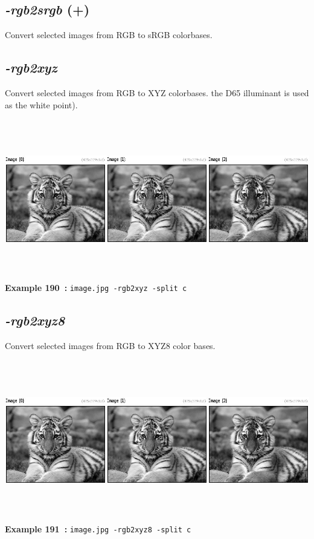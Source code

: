 \documentclass[a4paper,11pt,twoside]{book}
\begin{document}
\subsection{\emph{-rgb2srgb} (+)}\vspace*{-0.5em}
Convert selected images from RGB to sRGB colorbases.


\subsection{\emph{-rgb2xyz} }\vspace*{-0.5em}
Convert selected images from RGB to XYZ colorbases.
the D65 illuminant is used as the white point).
\begin{center}\includegraphics[keepaspectratio=true,height=7cm,width=\textwidth]{img/gmic_def190.jpg}\\
{\footnotesize \textbf{Example 190~:} \texttt{image.jpg -rgb2xyz -split c}}
\end{center}

\subsection{\emph{-rgb2xyz8} }\vspace*{-0.5em}
Convert selected images from RGB to XYZ8 color bases.
\begin{center}\includegraphics[keepaspectratio=true,height=7cm,width=\textwidth]{img/gmic_def191.jpg}\\
{\footnotesize \textbf{Example 191~:} \texttt{image.jpg -rgb2xyz8 -split c}}
\end{center}
\end{document}
